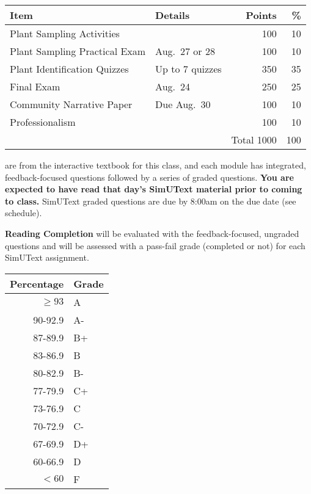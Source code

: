 \documentclass{tufte-handout}
\begin{document}
\begin{fullwidth}

\begin{table}
\begin{tabular}{l l  r r}
Item & Details & Points & \% \\
\hline
Plant Sampling Activities &  & 100 & 10 \\
Plant Sampling Practical Exam & Aug.\ 27 or 28 & 100 & 10 \\
Plant Identification Quizzes & Up to 7 quizzes & 350 & 35 \\
Final Exam & Aug.\ 24 & 250  & 25 \\						%
Community Narrative Paper & Due Aug.\ 30 & 100 & 10 \\
Professionalism & & 100 & 10 \\
\hline
& & Total 1000 & 100
\end{tabular}
\end{table}

\end{fullwidth}

 are from the interactive textbook for this class, and each module has integrated, feedback-focused questions followed by a series of graded questions. \textbf{You are expected to have read that day's SimUText material prior to coming to class. } SimUText graded questions are due by 8:00am on the due date (see schedule).

\textbf{Reading Completion} will be evaluated with the feedback-focused, ungraded questions and will be assessed with a pass-fail grade (completed or not) for each SimUText assignment. 

\begin{margintable}
\begin{tabular}{rl}
Percentage & Grade \\
\hline 
$\ge93$ & A \\
90-92.9 & A- \\
87-89.9 & B+ \\
83-86.9 & B \\
80-82.9 & B- \\
77-79.9 & C+ \\
73-76.9 & C \\
70-72.9 & C- \\
67-69.9 & D+ \\
60-66.9 & D \\
$<60$ & F \\
\hline
\end{tabular}
\end{margintable}
\end{document}
